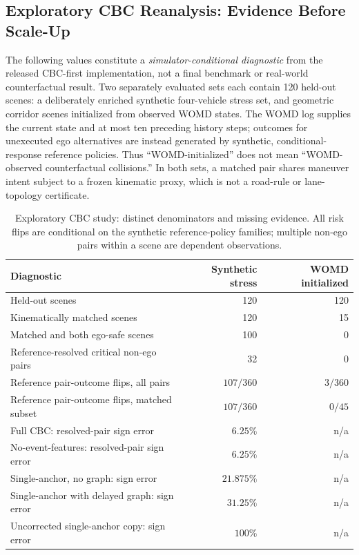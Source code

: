 \documentclass[10pt]{article}
\begin{document}
\subsection{Exploratory CBC Reanalysis: Evidence Before Scale-Up}
\label{sec:cbc-pilot}
The following values constitute a \emph{simulator-conditional diagnostic}
from the released CBC-first implementation, not a final benchmark or
real-world counterfactual result. Two separately evaluated sets each contain
120 held-out scenes: a deliberately enriched synthetic four-vehicle stress
set, and geometric corridor scenes initialized from observed WOMD states.
The WOMD log supplies the current state and at most ten preceding history
steps; outcomes for unexecuted ego alternatives are instead generated by
synthetic, conditional-response reference policies. Thus ``WOMD-initialized''
does not mean ``WOMD-observed counterfactual collisions.'' In both sets,
a matched pair shares maneuver intent subject to a frozen kinematic proxy,
which is not a road-rule or lane-topology certificate.
\begin{table}[t]
\centering\small
\caption{Exploratory CBC study: distinct denominators and missing evidence.
All risk flips are conditional on the synthetic reference-policy families;
multiple non-ego pairs within a scene are dependent observations.}
\label{tab:cbc-preliminary}
\begin{tabular}{lrr}
\toprule
Diagnostic & Synthetic stress & WOMD initialized \\
\midrule
Held-out scenes & 120 & 120 \\
Kinematically matched scenes & 120 & 15 \\
Matched and both ego-safe scenes & 100 & 0 \\
Reference-resolved critical non-ego pairs & 32 & 0 \\
Reference pair-outcome flips, all pairs & $107/360$ & $3/360$ \\
Reference pair-outcome flips, matched subset & $107/360$ & $0/45$ \\
\midrule
Full CBC: resolved-pair sign error & $6.25\%$ & n/a \\
No-event-features: resolved-pair sign error & $6.25\%$ & n/a \\
Single-anchor, no graph: sign error & $21.875\%$ & n/a \\
Single-anchor with delayed graph: sign error & $31.25\%$ & n/a \\
Uncorrected single-anchor copy: sign error & $100\%$ & n/a \\
\bottomrule
\end{tabular}
\end{table}
\end{document}
